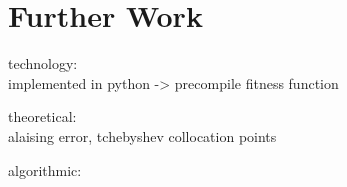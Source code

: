 \documentclass[./\jobname.tex]{subfiles}
\begin{document}
\chapter{Further Work}
technology: \\
implemented in python -> precompile fitness function

theoretical:\\
alaising error, tchebyshev collocation points

algorithmic:\\
\end{document}
